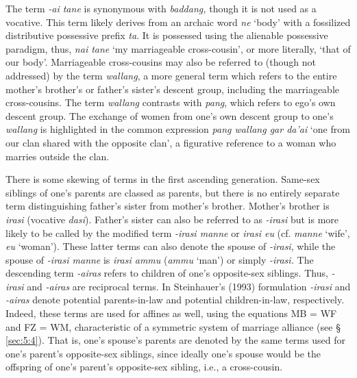 The term \textit{-ai tane} is synonymous with \textit{baddang,} though it is not used as a vocative\textit{.} This term likely derives from an archaic word \textit{ne} `body' with a fossilized distributive possessive prefix \textit{ta}.\textit{} It is possessed using the alienable possessive paradigm, thus, \textit{nai tane} `my marriageable cross-cousin', or more literally, `that of our body'. Marriageable cross-cousins may also be referred to (though not addressed) by the term \textit{wallang}, a more general term which refers to the entire mother's brother's or father's sister's descent group, including the marriageable cross-cousins. The term \textit{wallang} contrasts with \textit{pang}, which refers to ego's own descent group. The exchange of women from one's own descent group to one's \textit{wallang} is highlighted in the common expression \textit{pang wallang gar da'ai} `one from our clan shared with the opposite clan', a figurative reference to a woman who marries outside the clan. 


There is some skewing of terms in the first ascending generation. Same-sex siblings of one's parents are classed as parents, but there is no entirely separate term distinguishing father's sister from mother's brother. Mother's brother is \textit{irasi} (vocative \textit{dasi}). Father's sister can also be referred to as \textit{-irasi} but is more likely to be called by the modified term \textit{-irasi manne} or \textit{irasi eu} (cf. \textit{manne} `wife', \textit{eu} `woman'). These latter terms can also denote the spouse of \textit{-irasi}, while the spouse of \textit{-irasi manne} is \textit{irasi ammu} (\textit{ammu} `man') or simply \textit{-irasi.} The descending term \textit{-airas} refers to children of one's opposite-sex siblings. Thus, \textit{-irasi} and \textit{-airas} are reciprocal terms. In Steinhauer's (1993) formulation \textit{-irasi} and \textit{-airas} denote potential parents-in-law and potential children-in-law, respectively. Indeed, these terms are used for affines as well, using the equations MB = WF and FZ = WM, characteristic of a symmetric system of marriage alliance (see {\S} \ref{sec:5:4}). That is, one's spouse's parents are denoted by the same terms used for one's parent's opposite-sex siblings, since ideally one's spouse would be the offspring of one's parent's opposite-sex sibling, i.e., a cross-cousin. 

